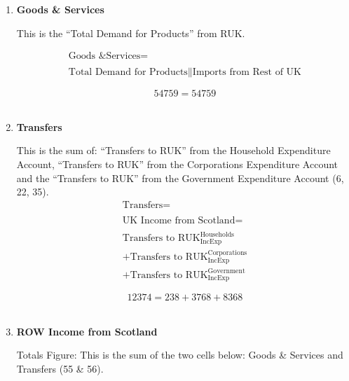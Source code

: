 \begin{enumerate}
\item \textbf {Goods \& Services}

This is the “Total Demand for Products” from RUK. \cite{ScotGov2013a}

\begin{equation}
\begin{split}
\text{Goods \& Services} =  \\ \\
\text{Total Demand for Products}\|\text{Imports from Rest of UK}
\end{split} \label{eq:2.5.56}
\end{equation}

\begin{equation} \nonumber
54759 = 54759
\end{equation}\\


\item \textbf {Transfers}

This is the sum of: ``Transfers to RUK'' from the Household Expenditure Account, ``Transfers to RUK'' from the Corporations Expenditure Account and the ``Transfers to RUK'' from the Government Expenditure Account (6, 22, 35).\\

\begin{equation}
\begin{split}
\text{Transfers} =  \\ \\
\text{UK Income from Scotland} =  \\ \\
\text{Transfers to RUK}^\text{Households}_\text{IncExp}\\
+\text{Transfers to RUK}^\text{Corporations}_\text{IncExp}\\
+\text{Transfers to RUK}^\text{Government}_\text{IncExp}
\end{split} \label{eq:2.5.57}
\end{equation}

\begin{equation} \nonumber
12374 = 238+3768+8368
\end{equation}\\


\item \textbf {ROW Income from Scotland}

Totals Figure: This is the sum of the two cells below: Goods \& Services and Transfers (55 \& 56).\\


\end{enumerate}
